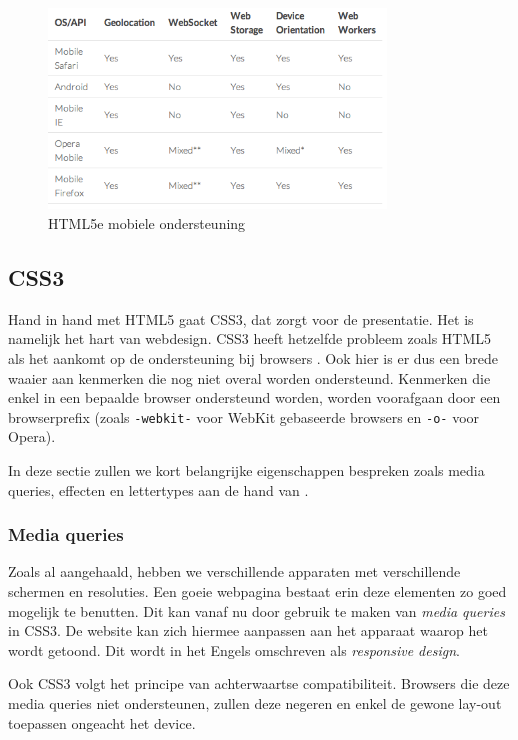 \begin{figure}
  \centering
  \includegraphics[width=0.8\textwidth]{figuren/html5e}
  \caption{HTML5e mobiele ondersteuning \cite{Hales2012}}
  \label{fig:html5e}
\end{figure}

\subsection{CSS3}
\label{ref:css3}
Hand in hand met HTML5 gaat CSS3, dat zorgt voor de presentatie. Het is namelijk het hart van webdesign. CSS3 heeft hetzelfde probleem zoals HTML5 als het aankomt op de ondersteuning bij browsers \cite{MacDonald2011}. Ook hier is er dus een brede waaier aan kenmerken die nog niet overal worden ondersteund. Kenmerken die enkel in een bepaalde browser ondersteund worden, worden voorafgaan door een browserprefix (zoals \texttt{-webkit-} voor WebKit gebaseerde browsers en \texttt{-o-} voor Opera).

In deze sectie zullen we kort belangrijke eigenschappen bespreken zoals media queries, effecten en lettertypes aan de hand van \cite{MacDonald2011}.

\subsubsection{Media queries}
Zoals al aangehaald, hebben we verschillende apparaten met verschillende schermen en resoluties. Een goeie webpagina bestaat erin deze elementen zo goed mogelijk te benutten. Dit kan vanaf nu door gebruik te maken van \emph{media queries} in CSS3. De website kan zich hiermee aanpassen aan het apparaat waarop het wordt getoond. Dit wordt in het Engels omschreven als \emph{responsive design}.

Ook CSS3 volgt het principe van achterwaartse compatibiliteit. Browsers die deze media queries niet ondersteunen, zullen deze negeren en enkel de gewone lay-out toepassen ongeacht het device.

